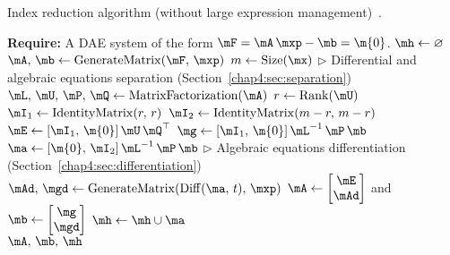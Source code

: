 \begin{breakablealgorithm}
  \caption{Index reduction algorithm (without large expression management)~\cite{stocco2024symbolic}.}
  \label{chap4:alg:index_reduction}
  \begin{algorithmic}[1]
    \State \textbf{Require:} A \ac{DAE} system of the form $\mF = \mA \, \mxp - \mb = \m{0}$.
     
      \State $\mh \gets \varnothing$ 
      \State $\mA, \, \mb \gets \mathrm{GenerateMatrix}(\mF, \, \mxp)$ 
      \State $m \gets \mathrm{Size}(\mx)$
        \State $\displaystyle\triangleright$ Differential and algebraic equations separation (Section~\ref{chap4:sec:separation})
        \State $\mL, \, \mU, \, \mP, \, \mQ \gets \mathrm{MatrixFactorization}(\mA)$ 
        \State $r \gets \mathrm{Rank}(\mU)$ 
        \State $\mI_1 \gets \mathrm{IdentityMatrix}(r, \, r)$ 
        \State $\mI_2 \gets \mathrm{IdentityMatrix}(m-r, \, m-r)$ 
        \State $\mE \gets [\mI_1, \, \m{0}] \, \mU \, \mQ^\top$ 
        \State $\mg \gets [\mI_1, \, \m{0}] \, \mL^{-1} \, \mP \, \mb$ 
        \State $\ma \gets [\m{0}, \, \mI_2] \, \mL^{-1} \, \mP \, \mb$ 
        \State $\displaystyle\triangleright$ Algebraic equations differentiation (Section~\ref{chap4:sec:differentiation})
        \State $\mAd, \, \mgd \gets \mathrm{GenerateMatrix}(\mathrm{Diff}(\ma, \, t), \, \mxp)$ 
        \State $\mA \gets \begin{bmatrix} \mE \\ \mAd \end{bmatrix}$ and $\mb \gets \begin{bmatrix} \mg \\ \mgd \end{bmatrix}$ 
        \State $\mh \gets \mh \cup \ma$ 
      \EndWhile \\
      \Return $\mA, \, \mb, \, \mh$ 
    \EndProcedure
  \end{algorithmic}
\end{breakablealgorithm}

